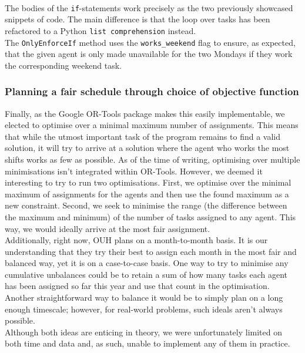 \\
The bodies of the \texttt{if}-statements work precisely as the two previously showcased snippets of code. The main difference is that the loop over tasks has been refactored to a Python \texttt{list comprehension} instead.
\\
The \texttt{OnlyEnforceIf} method uses the \texttt{works_weekend} flag to ensure, as expected, that the given agent is only made unavailable for the two Mondays if they work the corresponding weekend task.

\subsubsection*{Planning a fair schedule through choice of objective function}
Finally, as the Google OR-Tools package makes this easily implementable, we elected to optimise over a minimal maximum number of assignments. This means that while the utmost important task of the program remains to find a valid solution, it will try to arrive at a solution where the agent who works the most shifts works as few as possible. As of the time of writing, optimising over multiple minimisations isn't integrated within OR-Tools. However, we deemed it interesting to try to run two optimisations. First, we optimise over the minimal maximum of assignments for the agents and then use the found maximum as a new constraint. Second, we seek to minimise the range (the difference between the maximum and minimum) of the number of tasks assigned to any agent. This way, we would ideally arrive at the most fair assignment.
\\
Additionally, right now, OUH plans on a month-to-month basis. It is our understanding that they try their best to assign each month in the most fair and balanced way, yet it is on a case-to-case basis. One way to try to minimise any cumulative unbalances could be to retain a sum of how many tasks each agent has been assigned so far this year and use that count in the optimisation. Another straightforward way to balance it would be to simply plan on a long enough timescale; however, for real-world problems, such ideals aren't always possible.
\\
Although both ideas are enticing in theory, we were unfortunately limited on both time and data and, as such, unable to implement any of them in practice.


